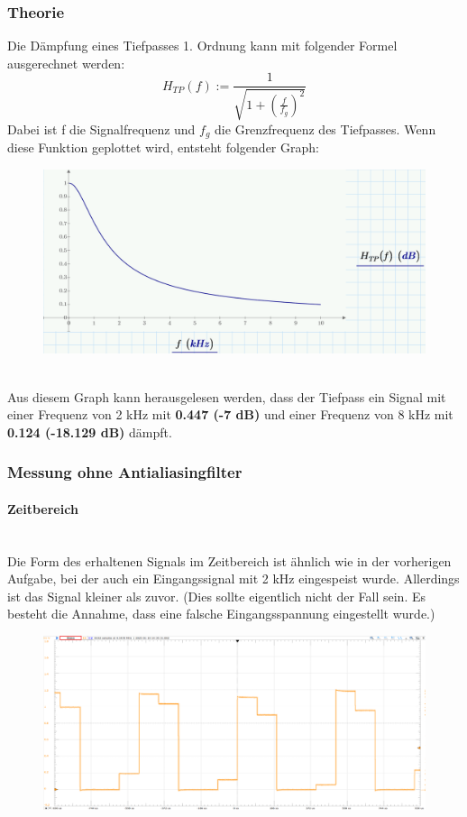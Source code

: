 \documentclass{article}
\begin{document}
\subsubsection{Theorie}
Die Dämpfung eines Tiefpasses 1. Ordnung kann mit folgender Formel ausgerechnet werden:
\begin{equation}
    H_{TP}(f) := \frac{1}{\sqrt{1 + \left( \frac{f}{f_g} \right)^2}}
    \label{eq:placeholder}
\end{equation}
Dabei ist f die Signalfrequenz und $f_g$ die Grenzfrequenz des Tiefpasses. Wenn diese Funktion geplottet wird, entsteht folgender Graph:\\
\begin{figure}[h]
    \centering
    \includegraphics[width=0.8\linewidth]{img/graph_02.png}
\end{figure}\\
Aus diesem Graph kann herausgelesen werden, dass der Tiefpass ein Signal mit einer Frequenz von 2 kHz mit \textbf{0.447 (-7 dB)} und einer Frequenz von 8 kHz mit \textbf{0.124 (-18.129 dB)} dämpft.\\
\newpage
\subsubsection{Messung ohne Antialiasingfilter}
\paragraph{Zeitbereich}\mbox{}\\
Die Form des erhaltenen Signals im Zeitbereich ist ähnlich wie in der vorherigen Aufgabe, bei der auch ein Eingangssignal mit 2 kHz eingespeist wurde. Allerdings ist das Signal kleiner als zuvor. (Dies sollte eigentlich nicht der Fall sein. Es besteht die Annahme, dass eine falsche Eingangsspannung eingestellt wurde.)
\begin{figure}[h]
    \centering
    \includegraphics[width=0.8\linewidth]{img/Signal_09.png}
\end{figure}
\end{document}
